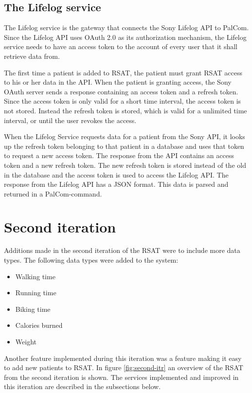\documentclass{cslthse-msc}
\begin{document}
\subsection{The Lifelog service}

The Lifelog service is the gateway that connects the Sony Lifelog API to PalCom. Since the Lifelog API uses OAuth 2.0 as its authorization mechanism, the Lifelog service needs to have an access token to the account of every user that it shall retrieve data from. 

The first time a patient is added to RSAT, the patient must grant RSAT access to his or her data in the API. When the patient is granting access, the Sony OAuth server sends a response containing an access token and a refresh token.  Since the access token is only valid for a short time interval, the access token is not stored. Instead the refresh token is stored, which is valid for a unlimited time interval, or until the user revokes the access. 

When the Lifelog Service requests data for a patient from the Sony API, it looks up the refresh token belonging to that patient in a database and uses that token to request a new access token. The response from the API contains an access token and a new refresh token. The new refresh token is stored instead of the old in the database and the access token is used to access the Lifelog API. The response from the Lifelog API has a JSON format. This data is parsed and returned in a PalCom-command.



\section{Second iteration}

Additions made in the second iteration of the RSAT were to include more data types. The following data types were added to the system: 

\begin{itemize}
	\item Walking time
	\item Running time
	\item Biking time
	\item Calories burned
	\item Weight
\end{itemize}

Another feature implemented during this iteration was a feature making it easy to add new patients to RSAT. In figure \ref{fig:second-itr} an overview of the RSAT from the second iteration is shown. The services implemented and improved in this iteration are described in the subsections below. 
\end{document}
